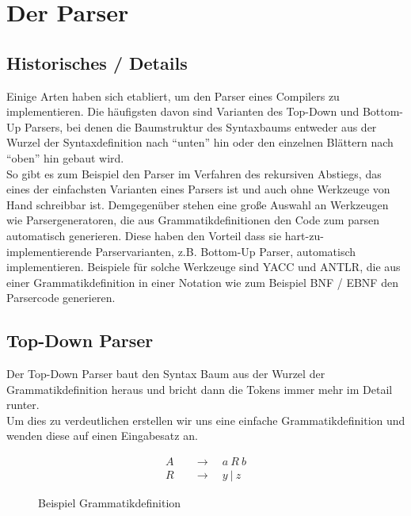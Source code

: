 \chapter{Der Parser}
\label{chap:theory:parser}

\section{Historisches / Details}

Einige Arten haben sich etabliert, um den Parser eines Compilers zu implementieren.
Die häufigsten davon sind Varianten des Top-Down und Bottom-Up Parsers, bei denen die Baumstruktur des Syntaxbaums entweder aus der Wurzel der Syntaxdefinition nach ``unten'' hin oder den einzelnen Blättern nach ``oben'' hin gebaut wird.\\
So gibt es zum Beispiel den Parser im Verfahren des rekursiven Abstiegs, das eines der einfachsten Varianten eines Parsers ist und auch ohne Werkzeuge von Hand schreibbar ist\cite{mossenbock:2024}.
Demgegenüber stehen eine große Auswahl an Werkzeugen wie Parsergeneratoren, die aus Grammatikdefinitionen den Code zum parsen automatisch generieren.
Diese haben den Vorteil dass sie hart-zu-implementierende Parservarianten, z.B. Bottom-Up Parser, automatisch implementieren.
Beispiele für solche Werkzeuge sind YACC und ANTLR, die aus einer Grammatikdefinition in einer Notation wie zum Beispiel BNF / EBNF den Parsercode generieren.

\section{Top-Down Parser}

Der Top-Down Parser baut den Syntax Baum aus der Wurzel der Grammatikdefinition heraus und bricht dann die Tokens immer mehr im Detail runter\cite{meduna2007elements}.\\
Um dies zu verdeutlichen erstellen wir uns eine einfache Grammatikdefinition und wenden diese auf einen Eingabesatz an.\\
\begin{figure}[H]
  \begin{align*}
    A &\quad\rightarrow\quad a\ R\ b \\
    R &\quad\rightarrow\quad y\ |\ z
  \end{align*}
  \caption{Beispiel Grammatikdefinition}
  \label{fig:theory:parser:topdown:grammar}
\end{figure}

